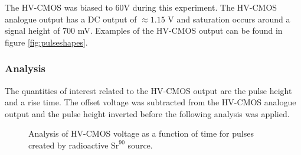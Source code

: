 The HV-CMOS was biased to 60V during this experiment.  The HV-CMOS analogue output has a DC output of $\approx 1.15$ V and saturation occurs around a signal height of 700 mV.  Examples of the HV-CMOS output can be found in figure \ref{fig:pulseshapes}.


\subsubsection{Analysis}
The quantities of interest related to the HV-CMOS output are the pulse height and a rise time.  The offset voltage was subtracted from the HV-CMOS analogue output and the pulse height inverted before the following analysis was applied.

\begin{figure}
\centering
{}
\hfill
\caption[Analysis of HV-CMOS voltage as a function of time for pulses created by radioactive strontium 90 source.]{Analysis of HV-CMOS voltage as a function of time for pulses created by radioactive $\text{Sr}^{90}$ source.}
\label{fig:pulseshapeanalysis}
\end{figure}

